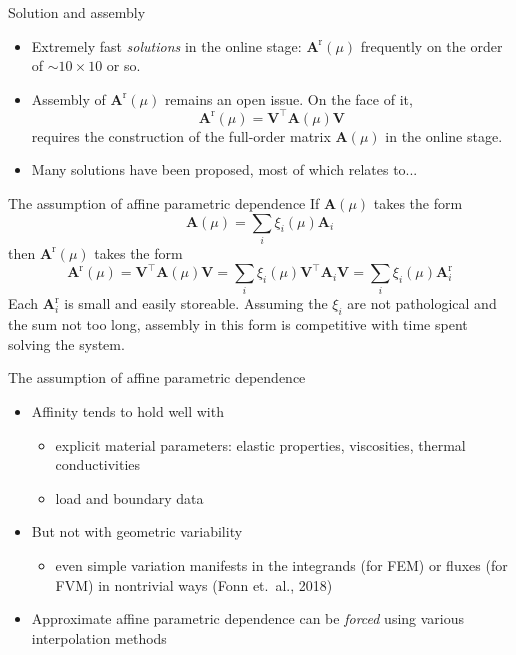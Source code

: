 \documentclass{sintefbeamer}
\begin{document}
\begin{frame}{Solution and assembly}
    \begin{itemize}
        \item Extremely fast \emph{solutions} in the online stage: \( \mathbf A^\mathup{r}(\mu) \) frequently on the order of \( \sim 10 \times 10 \) or so.
        \item Assembly of \( \mathbf A^\mathup{r}(\mu) \) remains an open issue. On the face of it,
        \[
            \mathbf A^\mathup{r} (\mu) = \mathbf V^\intercal \mathbf A(\mu) \mathbf V
        \]
        requires the construction of the full-order matrix \( \mathbf{A}(\mu) \) in the online stage.
        \item Many solutions have been proposed, most of which relates to...
    \end{itemize}
\end{frame}

\begin{frame}{The assumption of affine parametric dependence}
    If \( \mathbf A(\mu) \) takes the form
    \[
        \mathbf A(\mu) = \sum_i \xi_i(\mu) \mathbf A_i
    \]
    then \( \mathbf A^\mathup{r}(\mu) \) takes the form
    \[
        \mathbf A^\mathup{r}(\mu) = \mathbf V^\intercal \mathbf A(\mu) \mathbf V = \sum_i \xi_i(\mu) \mathbf V^\intercal \mathbf A_i \mathbf V = \sum_i \xi_i(\mu) \mathbf A^\mathup{r}_i
    \]
    Each $\mathbf A^\mathup{r}_i$ is small and easily storeable. Assuming the $\xi_i$ are not pathological and the sum not too long, assembly in this form is competitive with time spent solving the system.
\end{frame}

\begin{frame}{The assumption of affine parametric dependence}
    \begin{itemize}
        \item Affinity tends to hold well with
        \begin{itemize}
            \item explicit material parameters: elastic properties, viscosities, thermal conductivities
            \item load and boundary data
        \end{itemize}
        \item But not with geometric variability
        \begin{itemize}
            \item even simple variation manifests in the integrands (for FEM) or fluxes (for FVM) in nontrivial ways (Fonn et.~al., 2018)
        \end{itemize}
        \item Approximate affine parametric dependence can be \emph{forced} using various interpolation methods
    \end{itemize}
\end{frame}
\end{document}
